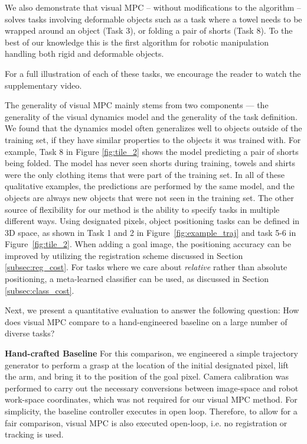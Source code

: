 We also demonstrate that visual MPC -- without modifications to the algorithm -- solves tasks involving deformable objects such as a task where a towel needs to be wrapped around an object (Task 3), or folding a pair of shorts (Task 8). To the best of our knowledge this is the first algorithm for robotic manipulation handling both rigid and deformable objects.

For a full illustration of each of these tasks, we encourage the reader to watch the supplementary video.

The generality of visual MPC mainly stems from two components --- the generality of the visual dynamics model and the generality of the task definition.
We found that the dynamics model often generalizes well to objects outside of the training set, if they have similar properties to the objects it was trained with. For example, Task 8 in Figure \ref{fig:tile_2} shows the model predicting a pair of shorts being folded. The model has never seen shorts during training, towels and shirts were the only clothing items that were part of the training set. In all of these qualitative examples, the predictions are performed by the same model, and the objects are always new objects that were not seen in the training set.
The other source of flexibility for our method is the ability to specify tasks in multiple different ways. Using designated pixels, object positioning tasks can be defined in 3D space, as shown in Task 1 and 2 in Figure~\ref{fig:example_traj} and task 5-6 in Figure~\ref{fig:tile_2}. When adding a goal image, the positioning accuracy can be improved by utilizing the registration scheme discussed in Section \ref{subsec:reg_cost}.
For tasks where we care about \emph{relative} rather than absolute positioning, a meta-learned classifier can be used, as discussed in Section \ref{subsec:class_cost}.

Next, we present a quantitative evaluation to answer the following question: How does visual MPC compare to a hand-engineered baseline on a large number of diverse tasks?

\noindent \textbf{Hand-crafted Baseline} For this comparison, we engineered a simple trajectory generator to perform a grasp at the location of the initial designated pixel, lift the arm, and bring it to the position of the goal pixel. Camera calibration was performed to carry out the necessary conversions between image-space and robot work-space coordinates, which was not required for our visual MPC method. For simplicity, the baseline controller executes in open loop. Therefore, to allow for a fair comparison, visual MPC is also executed open-loop, i.e. no registration or tracking is used.

